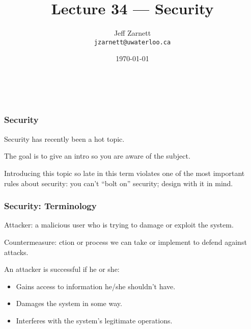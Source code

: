 
\usepackage{tikz-3dplot}

\title{Lecture 34 --- Security}

\author{Jeff Zarnett \\ \small \texttt{jzarnett@uwaterloo.ca}}
\date{\today}



\begin{frame}
  \titlepage

  \vfill
  \begin{center}
    \\
                  {\tiny\CcNote{\CcLongnameByNcSa}}
                  \vspace*{-2.5ex}
  \end{center}

\end{frame}


\begin{frame}
\frametitle{Security}
\begin{changemargin}{1cm}

Security has recently been a hot topic.

The goal is to give an intro so you are aware of the subject.

Introducing this topic so late in this term violates one of the most important rules about security: you can't ``bolt on'' security; design with it in mind.

\end{changemargin}
\end{frame}


\begin{frame}
\frametitle{Security: Terminology}
\begin{changemargin}{1cm}

\alert{Attacker}: a malicious user who is trying to damage or exploit the system.

\alert{Countermeasure}: ction or process we can take or implement to defend against attacks.

 An attacker is successful if he or she:
\begin{itemize}
	\item Gains access to information he/she shouldn't have.
	\item Damages the system in some way.
	\item Interferes with the system's legitimate operations.
\end{itemize} 

\end{changemargin}
\end{frame}

